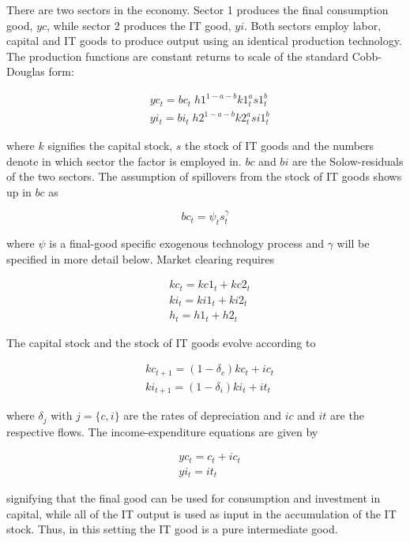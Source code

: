 \documentclass[11pt]{article}
\renewcommand{\[}{\begin{equation}}
\renewcommand{\]}{\end{equation}}
\begin{document}
There are two sectors in the economy. Sector 1 produces the final consumption good, $yc$, while sector 2 produces the IT good, $yi$. Both sectors employ labor, capital and IT goods to produce output using an identical production technology. The production functions are constant returns to scale of the standard Cobb-Douglas form:

\begin{align}
& yc_t = bc_t \; h1^{1-a-b} k1_t^a s1_t^b \\
 & yi_t = bi_t  \; h2^{1-a-b} k2_t^a si1_t^b 
\end{align}

where $k$ signifies the capital stock, $s$ the stock of IT goods and the numbers denote in which sector the factor is employed in. $bc$ and $bi$ are the Solow-residuals of the two sectors. The assumption of spillovers from the stock of IT goods shows up in $bc$ as 

\begin{equation}
bc_t  = \psi_t  s_t^\gamma
\end{equation}

where $\psi$ is a final-good specific exogenous technology process and $\gamma$ will be specified in more detail below. Market clearing requires

\begin{align}
& kc_t  = kc1_t + kc2_t \\
& ki_t = ki1_t + ki2_t \\
& h_t  = h1_t + h2_t 
\end{align}

The capital stock and the stock of IT goods evolve according to

\begin{align}
& kc_{t+1}  = (1-\delta_c )kc_t + ic_t \\
& ki_{t+1}  = (1-\delta_i)ki_t + it_t 
\end{align}

where $\delta_j$ with $j = \{c,i\}$ are the rates of depreciation and $ic$ and $it$ are the respective flows. The income-expenditure equations are given by

\begin{align}
& yc_t = c_t + ic_t \\
& yi_t = it_t 
\end{align}

signifying that the final good can be used for consumption and investment in capital, while all of the IT output is used as input in the accumulation of the IT stock. Thus, in this setting the IT good is a pure intermediate good.
\end{document}
